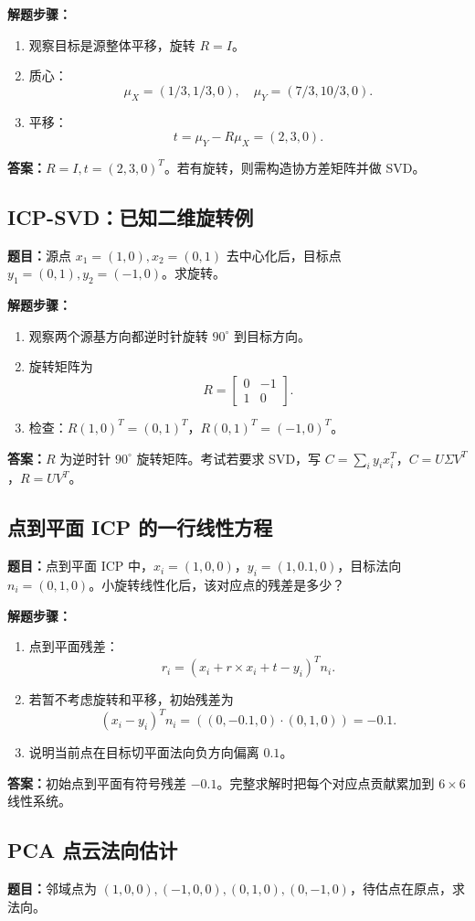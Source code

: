 \documentclass[UTF8,zihao=-4,scheme=chinese,fontset=fandol]{ctexart}
\begin{document}
\textbf{解题步骤：}
\begin{enumerate}
  \item 观察目标是源整体平移，旋转 $R=I$。
  \item 质心：
  \[
  \mu_X=(1/3,1/3,0),\quad \mu_Y=(7/3,10/3,0).
  \]
  \item 平移：
  \[
  t=\mu_Y-R\mu_X=(2,3,0).
  \]
\end{enumerate}
\textbf{答案：}$R=I,t=(2,3,0)^T$。若有旋转，则需构造协方差矩阵并做 SVD。

\subsection{ICP-SVD：已知二维旋转例}
\textbf{题目：}源点 $x_1=(1,0),x_2=(0,1)$ 去中心化后，目标点 $y_1=(0,1),y_2=(-1,0)$。求旋转。

\textbf{解题步骤：}
\begin{enumerate}
  \item 观察两个源基方向都逆时针旋转 $90^\circ$ 到目标方向。
  \item 旋转矩阵为
  \[
  R=\begin{bmatrix}0&-1\\1&0\end{bmatrix}.
  \]
  \item 检查：$R(1,0)^T=(0,1)^T$，$R(0,1)^T=(-1,0)^T$。
\end{enumerate}
\textbf{答案：}$R$ 为逆时针 $90^\circ$ 旋转矩阵。考试若要求 SVD，写 $C=\sum_i y_ix_i^T$，$C=U\Sigma V^T$，$R=UV^T$。

\subsection{点到平面 ICP 的一行线性方程}
\textbf{题目：}点到平面 ICP 中，$x_i=(1,0,0)$，$y_i=(1,0.1,0)$，目标法向 $n_i=(0,1,0)$。小旋转线性化后，该对应点的残差是多少？

\textbf{解题步骤：}
\begin{enumerate}
  \item 点到平面残差：
  \[
  r_i=(x_i+r\times x_i+t-y_i)^Tn_i.
  \]
  \item 若暂不考虑旋转和平移，初始残差为
  \[
  (x_i-y_i)^Tn_i=((0,-0.1,0)\cdot(0,1,0))=-0.1.
  \]
  \item 说明当前点在目标切平面法向负方向偏离 $0.1$。
\end{enumerate}
\textbf{答案：}初始点到平面有符号残差 $-0.1$。完整求解时把每个对应点贡献累加到 $6\times6$ 线性系统。

\subsection{PCA 点云法向估计}
\textbf{题目：}邻域点为 $(1,0,0),(-1,0,0),(0,1,0),(0,-1,0)$，待估点在原点，求法向。
\end{document}
